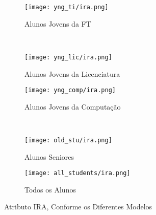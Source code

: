 \clearpage
\begin{figure}[!ht]
    \centering
    \begin{subfigure}[b]{0.48\textwidth}
        \centering
        \texttt{[image: yng\_ti/ira.png]}
        \caption{Alunos Jovens da FT}
    \end{subfigure}
    ~
    \begin{subfigure}[b]{0.48\textwidth}
        \centering
        \texttt{[image: yng\_lic/ira.png]}
        \caption{Alunos Jovens da Licenciatura}
    \end{subfigure}

    \begin{subfigure}[b]{0.48\textwidth}
        \centering
        \texttt{[image: yng\_comp/ira.png]}
        \caption{Alunos Jovens da Computação}
    \end{subfigure}
    ~
    \begin{subfigure}[b]{0.48\textwidth}
        \centering
        \texttt{[image: old\_stu/ira.png]}
        \caption{Alunos Seniores}
    \end{subfigure}

    \begin{subfigure}[b]{0.48\textwidth}
        \centering
        \texttt{[image: all\_students/ira.png]}
        \caption{Todos os Alunos}
    \end{subfigure}
    \caption{Atributo IRA, Conforme os Diferentes Modelos}
\end{figure}

